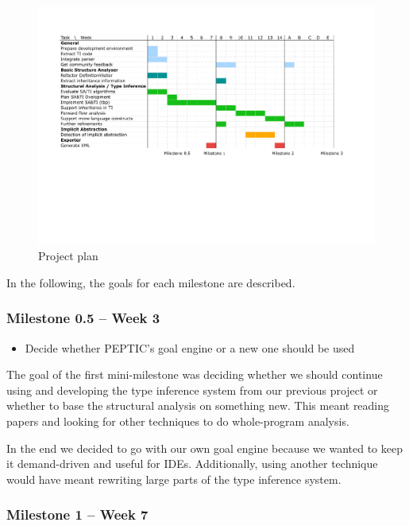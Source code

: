 \documentclass[12pt,halfparskip,DIV11,BCOR10mm]{scrreprt}
\begin{document}
\begin{figure}[H]
 \centering
 \includegraphics[width=\textwidth, trim=50 220 80 50, clip=true]{project/project-plan-v2}
 \caption{Project plan}
 \label{fig:project_plan}
\end{figure}

In the following, the goals for each milestone are described.

\subsubsection{Milestone 0.5 – Week 3}

\begin{itemize}
    \item Decide whether PEPTIC's goal engine or a new one should be used
\end{itemize}

The goal of the first mini-milestone was deciding whether we should continue using and developing the type inference system from our previous project or whether to base the structural analysis on something new. This meant reading papers and looking for other techniques to do whole-program analysis.

In the end we decided to go with our own goal engine because we wanted to keep it demand-driven and useful for IDEs. Additionally, using another technique would have meant rewriting large parts of the type inference system.

\subsubsection{Milestone 1 – Week 7}
\end{document}
